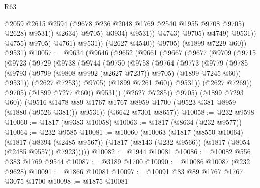 \begin{lexlean}{R63}
\begin{coremodule}
                                                @2059
                                                @2615
                                                @2594
                                                (@9678 @236 @2048 @1769 @2540 @1955 @9708 @9705)
                                                @2628)
                                              @9531))
                                          @2634)
                                        @9705)
                                      @3934)
                                    @9531))
                                @4743)
                              @9705)
                            @4749)
                          @9531))
                      @4755)
                    @9705)
                  @4761)
                @9531))
            (@2627 @4540))
          @9705)
        (@1899 @7229 @60))
      @9531)
@10057 := @9634
    (@9646
      (@9652
        (@9661
          (@9667
            (@9677
              (@9709
                (@9715
                  (@9723
                    (@9729
                      (@9738
                        (@9744
                          (@9750
                            (@9758
                              (@9764
                                (@9773
                                  (@9779
                                    (@9785
                                      (@9793
                                        (@9799 (@9808 @9992 (@2627 @7237)) @9705)
                                        (@1899 @7245 @60))
                                      @9531))
                                  (@2627 @7253))
                                @9705)
                              (@1899 @7261 @60))
                            @9531))
                        (@2627 @7269))
                      @9705)
                    (@1899 @7277 @60))
                  @9531))
              (@2627 @7285))
            @9705)
          (@1899 @7293 @60))
        (@9516 @1478 @89 @1767 @1767 @8959 @1700 (@9523 @381 @8959 (@1880 (@9526 @381))) @9531))
      (@6642 @7301 @8657))
@10058 := @232 @9598
@10060 := @1817 (@9383 @10058)
@10063 := @1817 (@8634 (@232 @9577))
@10064 := @232 @9585
@10081 := @10060
    (@10063
      (@1817
        (@8550 @10064)
        (@1817
          (@8394 (@2485 @9567))
          (@1817 (@8143 (@232 @9566)) (@1817 (@8054 (@2485 @9557)) @7923)))))
@10082 := @1944 @10081
@10086 := @10082 @556 @383 @1769 @9544
@10087 := @3189 @1700
@10090 := @10086 @10087 (@232 @9628)
@10091 := @1866 @10081
@10097 := @10091 @83 @89 @1767 @1767 @3075 @1700
@10098 := @1875 @10081

\end{coremodule}
\end{lexlean}
